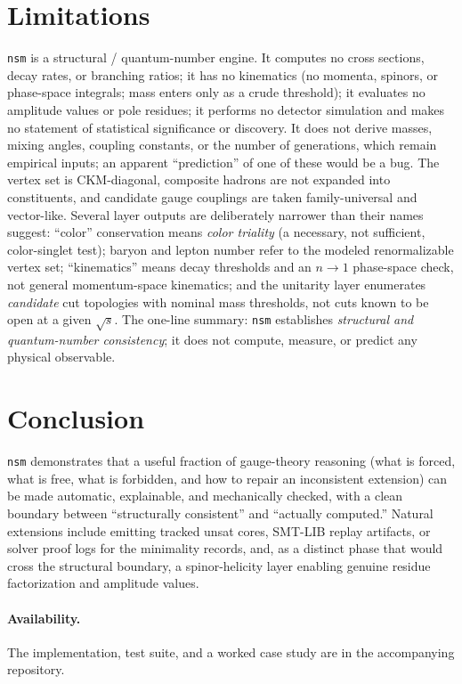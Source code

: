 \documentclass[11pt]{article}
\newcommand{\nsm}{\texttt{nsm}}
\begin{document}
\section{Limitations}
\label{sec:limits}

\nsm{} is a structural / quantum-number engine. It computes no cross sections,
decay rates, or branching ratios; it has no kinematics (no momenta, spinors, or
phase-space integrals; mass enters only as a crude threshold); it evaluates no
amplitude values or pole residues; it performs no detector simulation and makes
no statement of statistical significance or discovery. It does not derive
masses, mixing angles, coupling constants, or the number of generations, which
remain empirical inputs; an apparent ``prediction'' of one of these would be a
bug. The vertex set is CKM-diagonal, composite hadrons are not expanded into
constituents, and candidate gauge couplings are taken family-universal and
vector-like. Several layer outputs are deliberately narrower than their names
suggest: ``color'' conservation means \emph{color triality} (a necessary, not
sufficient, color-singlet test); baryon and lepton number refer to the modeled
renormalizable vertex set; ``kinematics'' means decay thresholds and an
$n\!\to\!1$ phase-space check, not general momentum-space kinematics; and the
unitarity layer enumerates \emph{candidate} cut topologies with nominal mass
thresholds, not cuts known to be open at a given $\sqrt{s}$. The one-line
summary: \nsm{} establishes \emph{structural and
quantum-number consistency}; it does not compute, measure, or predict any
physical observable.

\section{Conclusion}

\nsm{} demonstrates that a useful fraction of gauge-theory reasoning (what is
forced, what is free, what is forbidden, and how to repair an inconsistent
extension) can be made automatic, explainable, and mechanically checked, with
a clean boundary between ``structurally consistent'' and ``actually computed.''
Natural extensions include emitting tracked unsat cores, SMT-LIB replay
artifacts, or solver proof logs for the minimality records, and, as a distinct
phase that would cross the structural boundary, a spinor-helicity layer enabling
genuine residue factorization and amplitude values.

\paragraph{Availability.} The implementation, test suite, and a worked
case study are in the accompanying repository.
\end{document}
